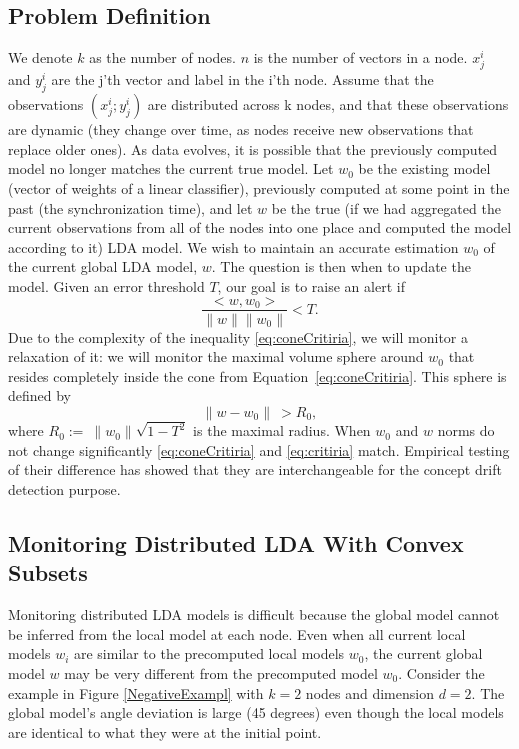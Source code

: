 \documentclass{sig-alternate-05-2015}
\begin{document}
\subsection{Problem Definition}
We denote $k$ as the number of nodes.
$n$ is the number of vectors in a node.
$x^i_j$ and $y^i_j$ are the j'th vector and label in the i'th node.
Assume that the observations ${(x^i_j; y^i_j)}$ are distributed across k nodes, 
and that these observations are dynamic (they change over time, as nodes receive 
new observations that replace older ones). 
As data evolves, it is possible that the previously computed model no longer 
matches the current true model. 
Let $w_0$ be the existing model (vector of weights of a linear classifier), 
previously computed at some point in the past (the synchronization time), 
and let $w$ be the true (if we had aggregated the current observations 
from all of the nodes into one place and computed the model according to it) LDA
model.
We wish to maintain an accurate estimation $w_0$ of the current global LDA model, $w$. 
The question is then when to update the model.
Given an error threshold $T$, our goal is to raise an alert if
\begin{equation} \label{eq:coneCritiria}
\frac{<w,w_0>}{\parallel w \parallel \parallel w_0 \parallel}  < T.
\end{equation}
Due to the complexity of the inequality \ref{eq:coneCritiria},
we will monitor a relaxation of it: we will monitor the maximal volume sphere
around $w_0$ that resides completely inside the cone from Equation~\ref{eq:coneCritiria}. 
This sphere is defined by
\begin{equation} \label{eq:critiria}
\parallel w-w_0 \parallel \  >  R_0,
\end{equation}
where $R_0 := \  \parallel w_0 \parallel \sqrt{1-T^2}$ is the maximal radius.
When $w_0$ and $w$ norms do not change significantly \ref{eq:coneCritiria} and
\ref{eq:critiria} match. Empirical testing of their difference has showed that
they are interchangeable for the concept drift detection purpose.

\subsection{Monitoring Distributed LDA With Convex Subsets}
Monitoring distributed LDA models is difficult because the
global model cannot be inferred from the local model at each
node. Even when all current local models $w_i$ are similar to the precomputed
local models $w_0$, the current global model $w$ may
be very different from the precomputed model $w_0$. Consider
the example in Figure \ref{NegativeExampl} with $k = 2$ nodes and dimension $d =
2$. The global model's angle deviation is large (45 degrees) even
though the local models are identical to what they were at the initial
point.
\end{document}
